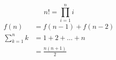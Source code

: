 \begin{equation}
    n! = \prod_{i=1}^n i
\end{equation}
\begin{align}
    f(n) &= f(n-1) + f(n-2)\\
    \sum\limits_{k=1}^n k &= 1 + 2 + \dots + n \nonumber \\
        &= \frac{n(n+1)}{2}
\end{align}
